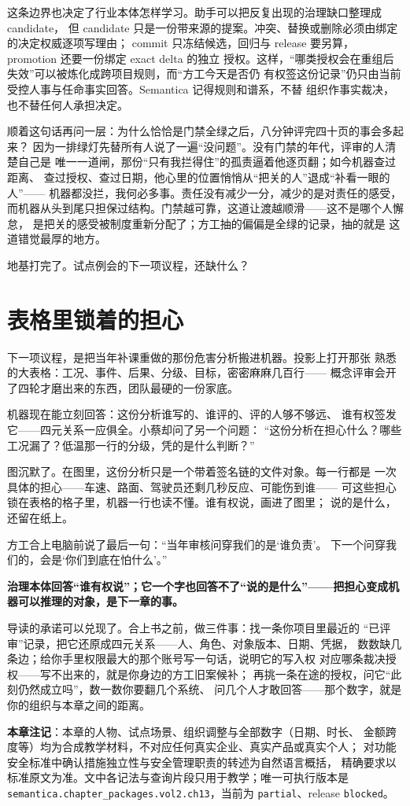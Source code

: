 这条边界也决定了行业本体怎样学习。助手可以把反复出现的治理缺口整理成 candidate，
但 candidate 只是一份带来源的提案。冲突、替换或删除必须由绑定的决定权威逐项写理由；
commit 只冻结候选，回归与 release 要另算，promotion 还要一份绑定 exact delta 的独立
授权。这样，“哪类授权会在重组后失效”可以被炼化成跨项目规则，而“方工今天是否仍
有权签这份记录”仍只由当前受控人事与任命事实回答。Semantica 记得规则和谱系，不替
组织作事实裁决，也不替任何人承担决定。

顺着这句话再问一层：为什么恰恰是门禁全绿之后，八分钟评完四十页的事会多起来？
因为一排绿灯先替所有人说了一遍“没问题”。没有门禁的年代，评审的人清楚自己是
唯一一道闸，那份“只有我拦得住”的孤责逼着他逐页翻；如今机器查过距离、
查过授权、查过日期，他心里的位置悄悄从“把关的人”退成“补看一眼的人”——
机器都没拦，我何必多事。责任没有减少一分，减少的是对责任的感受，
而机器从头到尾只担保过结构。门禁越可靠，这道让渡越顺滑——这不是哪个人懈怠，
是把关的感受被制度重新分配了；方工抽的偏偏是全绿的记录，抽的就是
这道错觉最厚的地方。

地基打完了。试点例会的下一项议程，还缺什么？

\section{表格里锁着的担心}

下一项议程，是把当年补课重做的那份危害分析搬进机器。投影上打开那张
熟悉的大表格：工况、事件、后果、分级、目标，密密麻麻几百行——
概念评审会开了四轮才磨出来的东西，团队最硬的一份家底。

机器现在能立刻回答：这份分析谁写的、谁评的、评的人够不够远、
谁有权签发它——四元关系一应俱全。小蔡却问了另一个问题：
“这份分析在担心什么？哪些工况漏了？低温那一行的分级，凭的是什么判断？”

图沉默了。在图里，这份分析只是一个带着签名链的文件对象。每一行都是
一次具体的担心——车速、路面、驾驶员还剩几秒反应、可能伤到谁——
可这些担心锁在表格的格子里，机器一行也读不懂。谁有权说，画进了图里；
说的是什么，还留在纸上。

方工合上电脑前说了最后一句：“当年审核问穿我们的是‘谁负责’。
下一个问穿我们的，会是‘你们到底在怕什么’。”

\textbf{治理本体回答“谁有权说”；它一个字也回答不了“说的是什么”——把担心变成机器可以推理的对象，是下一章的事。}

导读的承诺可以兑现了。合上书之前，做三件事：找一条你项目里最近的
“已评审”记录，把它还原成四元关系——人、角色、对象版本、日期、凭据，
数数缺几条边；给你手里权限最大的那个账号写一句话，说明它的写入权
对应哪条裁决授权——写不出来的，就是你身边的方工旧案候补；
再挑一条在途的授权，问它“此刻仍然成立吗”，数一数你要翻几个系统、
问几个人才敢回答——那个数字，就是你的组织与本章之间的距离。


\begin{noteblock}
\textbf{本章注记}：本章的人物、试点场景、组织调整与全部数字（日期、时长、
金额跨度等）均为合成教学材料，不对应任何真实企业、真实产品或真实个人；
对功能安全标准中确认措施独立性与安全管理职责的转述为自然语言概括，
精确要求以标准原文为准。文中各记法与查询片段只用于教学；唯一可执行版本是
\nolinkurl{semantica.chapter_packages.vol2.ch13}，当前为 \nolinkurl{partial}、release \nolinkurl{blocked}。
\end{noteblock}
